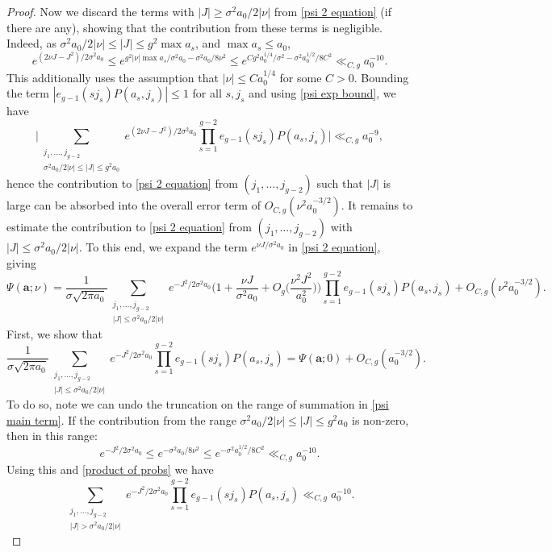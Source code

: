 \documentclass[10pt,a4paper]{amsart}
\newcommand{\ru}[1]{e_{g-1}(#1)}
\renewcommand{\geq}{\geqslant}
\renewcommand{\leq}{\leqslant}
\begin{document}
\begin{proof}
    Now we discard the terms with $|J|\geq \sigma^{2}a_{0}/2|\nu|$ from \cref{psi 2 equation} (if there are any), showing that the contribution from these terms is negligible. Indeed, as $\sigma^{2}a_{0}/2|\nu|\leq |J|\leq g^{2}\max a_{s}$, and $\max a_{s}\leq a_{0}$,
    \begin{equation}\label{psi exp bound}
        e^{(2\nu J-J^{2})/2\sigma^{2}a_{0}}\leq e^{g^{2}|\nu|\max a_{s}/\sigma^{2}a_{0} -\sigma^{2}a_{0}/8\nu^{2}}\leq e^{Cg^{2}a_{0}^{1/4}/\sigma^{2}-\sigma^{2}a_{0}^{1/2}/8C^{2}}\ll_{C,g} a_{0}^{-10}.
    \end{equation}
    This additionally uses the assumption that $|\nu|\leq Ca_{0}^{1/4}$ for some $C>0$. Bounding the term $|\ru{sj_{s}}P(a_{s},j_{s})|\leq 1$ for all $s, j_{s}$ and using \cref{psi exp bound}, we have
    \[\Big | \sum_{\substack{j_{1},\ldots, j_{g-2}\\ \sigma^{2}a_{0}/2|\nu|\leq|J|\leq g^{2}a_{0}}} e^{(2\nu J-J^{2})/2\sigma^{2}a_{0}}\prod_{s=1}^{g-2}\ru{sj_{s}}P(a_{s},j_{s})\Big |\ll_{C,g} a_{0}^{-9},\]
    hence the contribution to \cref{psi 2 equation} from $(j_{1},\ldots, j_{g-2})$ such that $|J|$ is large can be absorbed into the overall error term of $O_{C,g}(\nu^{2}a_{0}^{-3/2})$. It remains to estimate the contribution to \cref{psi 2 equation} from $(j_{1},\ldots, j_{g-2}) $ with $|J|\leq \sigma^{2}a_{0}/2|\nu|$. To this end, we expand the term $e^{\nu J/\sigma^{2}a_{0}}$ in \cref{psi 2 equation}, giving
    \begin{equation}\label{psi proof eq}
        \Psi(\mathbf{a};\nu)=\frac{1}{\sigma\sqrt{2\pi a_{0}}}\sum_{\substack{j_{1},\ldots, j_{g-2}\\|J|\leq \sigma^{2}a_{0}/2|\nu|}}e^{-J^{2}/2\sigma^{2}a_{0}}\Big (1+\frac{\nu J}{\sigma^{2}a_{0}}+O_{g}\Big(\frac{\nu^{2}J^{2}}{a_{0}^{2}}\Big)\Big )\prod_{s=1}^{g-2}\ru{sj_{s}}P(a_{s},j_{s})+O_{C,g}(\nu^{2}a_{0}^{-3/2}).
    \end{equation}
    First, we show that
    \begin{equation}\label{psi main term}
        \frac{1}{\sigma\sqrt{2\pi a_{0}}}\sum_{\substack{j_{1},\ldots, j_{g-2}\\|J|\leq \sigma^{2}a_{0}/2|\nu|}}e^{-J^{2}/2\sigma^{2}a_{0}}\prod_{s=1}^{g-2}\ru{sj_{s}}P(a_{s},j_{s})=\Psi(\mathbf{a};0)+O_{C,g}(a_{0}^{-3/2}).
    \end{equation}
    To do so, note we can undo the truncation on the range of summation in \cref{psi main term}. If the contribution from the range $\sigma^{2}a_{0}/2|\nu|\leq |J|\leq g^{2}a_{0}$ is non-zero, then in this range:
    \[e^{-J^{2}/2\sigma^{2}a_{0}}\leq e^{-\sigma^{2}a_{0}/8\nu^{2}}\leq e^{-\sigma^{2}a_{0}^{1/2}/8C^{2}}\ll_{C,g}a_{0}^{-10}.\]
    Using this and \cref{product of probs} we have
    \begin{equation}\label{range truncation}
        \sum_{\substack{j_{1},\ldots, j_{g-2}\\|J|> \sigma^{2}a_{0}/2|\nu|}}e^{-J^{2}/2\sigma^{2}a_{0}}\prod_{s=1}^{g-2}\ru{sj_{s}}P(a_{s},j_{s})\ll_{C,g} a_{0}^{-10}.
    \end{equation}
  

\end{proof}
\end{document}

